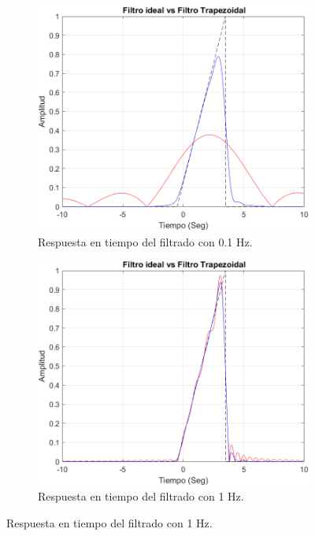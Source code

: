 \begin{figure}[H]
	\centering
	\begin{subfigure}[b]{0.48\linewidth}
		\includegraphics[width=\linewidth]{img/0-1Hz}
		\caption{\scriptsize Respuesta en tiempo del filtrado con 0.1 Hz.}
		\label{subfig:tiempo01}
	\end{subfigure}
	\begin{subfigure}[b]{0.48\linewidth}
		\includegraphics[width=\linewidth]{img/1Hz}
		\caption{\scriptsize Respuesta en tiempo del filtrado con 1 Hz.}
		\label{subfig:tiempo1}

\end{subfigure}
\end{figure}
